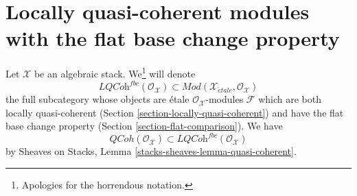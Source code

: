 \documentclass{stacks-project}
\theoremstyle{plain}
\theoremstyle{definition}
\theoremstyle{remark}
\numberwithin{equation}{subsection}
\def\etale{{\acute{e}tale}}
\def\QCoh{\mathit{QCoh}}
\begin{document}
\section{Locally quasi-coherent modules with the flat base change property}
\label{section-loc-qcoh-flat-base-change}

\noindent
Let $\mathcal{X}$ be an algebraic stack. We\footnote{Apologies
for the horrendous notation.} will denote
$$
\textit{LQCoh}^{fbc}(\mathcal{O}_\mathcal{X})
\subset
\textit{Mod}(\mathcal{X}_\etale, \mathcal{O}_\mathcal{X})
$$
the full subcategory whose objects are \'etale
$\mathcal{O}_\mathcal{X}$-modules $\mathcal{F}$
which are both locally quasi-coherent
(Section \ref{section-locally-quasi-coherent})
and have the flat base change property
(Section \ref{section-flat-comparison}).
We have
$$
\QCoh(\mathcal{O}_\mathcal{X}) \subset
\textit{LQCoh}^{fbc}(\mathcal{O}_\mathcal{X})
$$
by Sheaves on Stacks, Lemma \ref{stacks-sheaves-lemma-quasi-coherent}.
\end{document}

